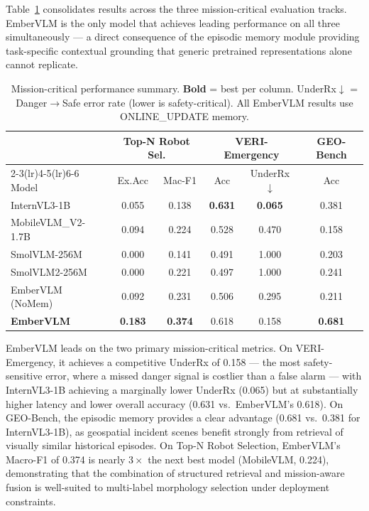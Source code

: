 \documentclass[runningheads]{llncs}
\begin{document}
Table~\ref{tab:mission-critical} consolidates results across the three mission-critical
evaluation tracks. EmberVLM is the only model that achieves leading performance on
all three simultaneously — a direct consequence of the episodic memory module
providing task-specific contextual grounding that generic pretrained representations
alone cannot replicate.

\begin{table}[ht]
\centering
\caption{Mission-critical performance summary. \textbf{Bold} = best per column.
UnderRx$\downarrow$ = Danger$\rightarrow$Safe error rate (lower is safety-critical).
All EmberVLM results use ONLINE\_UPDATE memory.}
\label{tab:mission-critical}
\setlength{\tabcolsep}{4pt}
\begin{tabular}{lccccc}
\toprule
 & \multicolumn{2}{c}{\textbf{Top-N Robot Sel.}} & \multicolumn{2}{c}{\textbf{VERI-Emergency}} & \textbf{GEO-Bench} \\
\cmidrule(lr){2-3}\cmidrule(lr){4-5}\cmidrule(lr){6-6}
Model & Ex.Acc & Mac-F1 & Acc & UnderRx$\downarrow$ & Acc \\
\midrule
InternVL3-1B       & 0.055 & 0.138 & \textbf{0.631} & \textbf{0.065} & 0.381 \\
MobileVLM\_V2-1.7B & 0.094 & 0.224 & 0.528 & 0.470 & 0.158 \\
SmolVLM-256M       & 0.000 & 0.141 & 0.491 & 1.000 & 0.203 \\
SmolVLM2-256M      & 0.000 & 0.221 & 0.497 & 1.000 & 0.241 \\
EmberVLM (NoMem)   & 0.092 & 0.231 & 0.506 & 0.295 & 0.211 \\
\textbf{EmberVLM}  & \textbf{0.183} & \textbf{0.374} & 0.618 & 0.158 & \textbf{0.681} \\
\bottomrule
\end{tabular}
\end{table}

EmberVLM leads on the two primary mission-critical metrics. On VERI-Emergency, it achieves
a competitive UnderRx of 0.158 — the most safety-sensitive error, where a missed danger
signal is costlier than a false alarm — with InternVL3-1B achieving a marginally lower
UnderRx (0.065) but at substantially higher latency and lower overall accuracy (0.631
vs.\ EmberVLM's 0.618). On GEO-Bench,
the episodic memory provides a clear advantage (0.681 vs.\ 0.381 for InternVL3-1B),
as geospatial incident scenes benefit strongly from retrieval of visually similar
historical episodes. On Top-N Robot Selection, EmberVLM's Macro-F1 of 0.374 is
nearly $3\times$ the next best model (MobileVLM, 0.224), demonstrating that the
combination of structured retrieval and mission-aware fusion is well-suited
to multi-label morphology selection under deployment constraints.
\end{document}
